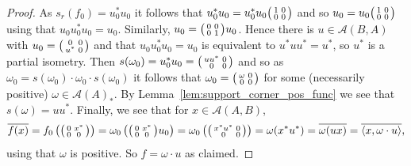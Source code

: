 \documentclass[a4paper,11pt]{article}
\theoremstyle{plain}
\theoremstyle{remark}
\newcommand{\mc}[1]{\mathcal{#1}}
\newcommand{\ip}[2]{{\langle {#1} , {#2} \rangle}}
\newenvironment{smat}{\bigl(\begin{smallmatrix}}{\end{smallmatrix}\bigr)}
\begin{document}
\begin{proof}
As $s_r(f_0) = u_0^* u_0$ it follows that $u_0^* u_0 = u_0^* u_0\begin{smat} 1 & 0 \\ 0 & 0 \end{smat}$ and so $u_0 = u_0 \begin{smat} 1 & 0 \\ 0 & 0 \end{smat}$ using that $u_0 u_0^* u_0 = u_0$.  Similarly, $u_0 = \begin{smat} 0 & 0 \\ 0 & 1 \end{smat} u_0$.  Hence there is $u\in \mc A(B,A)$ with $u_0 = \begin{smat} 0 & 0 \\ u^* & 0\end{smat}$ and that $u_0 u_0^* u_0 = u_0$ is equivalent to $u^*uu^*=u^*$, so $u^*$ is a partial isometry.  Then $s(\omega_0) = u_0^*u_0 = \begin{smat} uu^* & 0 \\ 0 & 0 \end{smat}$ and so as $\omega_0 = s(\omega_0) \cdot \omega_0 \cdot s(\omega_0)$ it follows that $\omega_0 = \begin{smat} \omega & 0 \\ 0 & 0 \end{smat}$ for some (necessarily positive) $\omega \in \mc A(A)_*$.  By Lemma~\ref{lem:support_corner_pos_func} we see that $s(\omega) = uu^*$.  Finally, we see that for $x\in\mc A(A,B)$,
\[ \overline{f(x)} = f_0\left( \begin{smat} 0 & x^* \\ 0 & 0 \end{smat} \right)
= \omega_0 \left( \begin{smat} 0 & x^* \\ 0 & 0 \end{smat} u_0 \right)
= \omega_0 \left( \begin{smat} x^*u^* & 0 \\ 0 & 0 \end{smat} \right)
= \omega(x^*u^*)
= \overline{ \omega(ux) } = \overline{ \ip{x}{\omega\cdot u} }, \]
using that $\omega$ is positive.  So $f = \omega\cdot u$ as claimed.


\end{proof}
\end{document}
